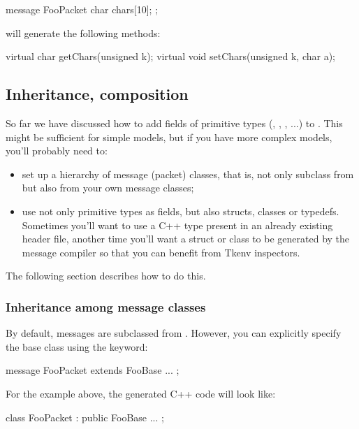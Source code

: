 \begin{msg}
message FooPacket
{
    char chars[10];
};
\end{msg}

will generate the following methods:

\begin{cpp}
virtual char getChars(unsigned k);
virtual void setChars(unsigned k, char a);
\end{cpp}


\subsection{Inheritance, composition}

So far we have discussed how to add fields of primitive types
(, , , ...) to
. This might be sufficient for simple models, but if you
have more complex models, you'll probably need to:

\begin{itemize}
  \item set up a hierarchy of message (packet) classes, that is,
    not only subclass from  but also from your
    own message classes;
  \item use not only primitive types as fields, but also structs,
    classes or typedefs. Sometimes you'll want to use a C++ type
    present in an already existing header file, another time you'll
    want a struct or class to be generated by the message
    compiler so that you can benefit from Tkenv inspectors.
\end{itemize}

The following section describes how to do this.


\subsubsection{Inheritance among message classes}

By default, messages are subclassed from . However, you can
explicitly specify the base class using the  keyword:

\begin{msg}
message FooPacket extends FooBase
{
    ...
};
\end{msg}

For the example above, the generated C++ code will look like:

\begin{cpp}
class FooPacket : public FooBase { ... };
\end{cpp}

